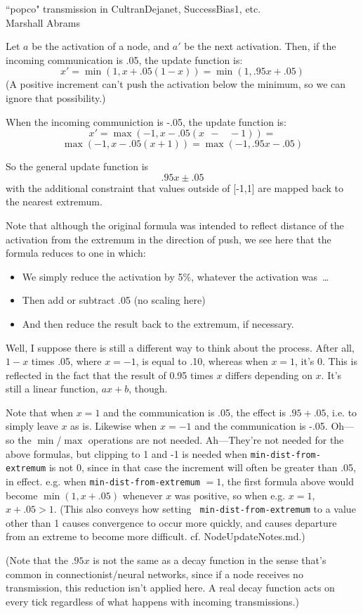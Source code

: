 \documentclass[11pt]{article}
\author{Marshall Abrams, University of Alabama at Birmingham, mabrams@uab.edu}
\makeatletter
\newcommand{\eg}{e.g.\@\xspace}
\newcommand{\cf}{cf.\@\xspace}
\makeatother
\begin{document}
\pagestyle{empty}
\myfontscale %

{\Large ``popco" transmission in CultranDejanet, SuccessBias1, etc.}\\
{\large Marshall Abrams}


Let $a$ be the activation of a node, and $a'$ be the next activation.
Then, if the incoming communication is .05, the update function
is:
\[
x' = \min(1,x + .05(1 - x)) = \min(1,.95x + .05)
\]
(A positive increment can't push the activation below the
minimum, so we can ignore that possibility.)

When the incoming communiction is -.05, the update function is:
\[
x' = 
\max(-1,x - .05(x \;\,-\;\;\; -1)) = 
\]
%
\[
\max(-1,x - .05(x + 1)) =  \max(-1, .95x - .05)
\]
%

So the general update function is
\[
.95x \pm .05
\]
with the additional constraint that values outside of [-1,1] are
mapped back to the nearest extremum.

Note that although the original formula was intended to reflect
distance of the activation from the extremum in the direction of
push, we see here that the formula reduces to one in which:
\begin{itemize}\vspace{-2ex}
\item We simply reduce the activation by 5\%, whatever the
activation was\ \ldots
\item Then add or subtract .05 (no scaling here)
\item And then reduce the result back to the extremum, if necessary.
\end{itemize}
Well, I suppose there is still a different way to think about the
process.  After all, $1-x$ times .05, where $x = -1$, is
equal to .10, whereas when $x=1$, it's 0.  This is reflected
in the fact that the result of 0.95 times $x$ differs depending
on $x$.  It's still a linear function, $ax+b$, though.

Note that when $x=1$ and the communication is .05, the effect is
$.95 + .05$, i.e. to simply leave $x$ as is.  Likewise when
$x=-1$ and the communication is -.05.  Oh---so the $\min$/$\max$
operations are not needed.  Ah---They're not needed for the above
formulas, but clipping to 1 and -1 is needed when 
{\tt min-dist-from-extremum} is not 0, since in that case the
increment will often be greater than .05, in effect.  \eg when 
{\tt min-dist-from-extremum} $=1$, the first formula above would
become $\min(1,x+.05)$ whenever $x$ was positive, so when \eg
$x=1$, $x+.05>1$.  (This also conveys how setting {\tt
min-dist-from-extremum} to a value other than 1 causes
convergence to occur more quickly, and causes departure from an extreme
to become more difficult.  \cf NodeUpdateNotes.md.)

(Note that the $.95x$ is not the same as a decay function in the
sense that's common in connectionist/neural networks, since if a
node receives no transmission, this reduction isn't applied here.  A
real decay function acts on every tick regardless of what
happens with incoming transmissions.)

%
\end{document}
